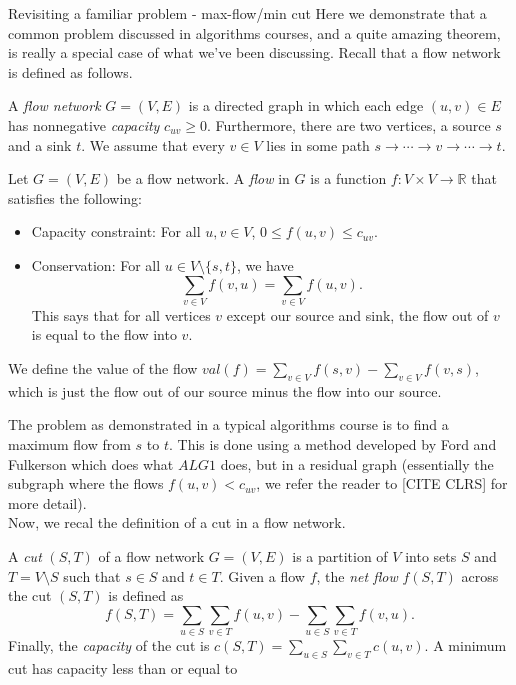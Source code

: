 \documentclass[11pt]{article}
\newcommand{\R}{\mathbb{R}}
\renewcommand{\'}{^{'}}
\newenvironment{definition}[2][Definition]{\begin{trivlist}
\item[\hskip \labelsep {\bfseries #1}\hskip \labelsep {\bfseries #2.}]}{\end{trivlist}}
\begin{document}
\begin{section}{Revisiting a familiar problem - max-flow/min cut}
	Here we demonstrate that a common problem discussed in algorithms courses, and a quite 
	amazing theorem, is really a special case of what we've been discussing. Recall that a 
	flow network is defined as follows.
	\begin{definition}{(Flow network)}
		A \emph{flow network} $G = (V,E)$ is a directed graph in which each edge $(u,v)\in E$ 
		has nonnegative \emph{capacity} $c_{uv} \geq 0$. Furthermore, there are two 
		vertices, a source $s$ and a sink $t$. We assume that every $v\in V$ lies in 
		some path $s\to \cdots \to v\to \cdots \to t$.
	\end{definition}
	\begin{definition}{(Flow)}
		Let $G = (V,E)$ be a flow network. A \emph{flow} in $G$ is a function $f: V\times V \to 
		\R$ that satisfies the following:
		\begin{itemize}
			\item Capacity constraint: For all $u,v\in V$, $0\leq f(u,v) \leq 
				c_{uv}$.
			\item Conservation: For all $u\in V\setminus \{s,t\}$, we have 
				\[
					\sum _{v\in V} f(v,u) = \sum_{v\in V} f(u,v).
				\]
				This says that for all vertices $v$ except our source and sink, the 
				flow out of $v$ is equal to the flow into $v$. 
		\end{itemize}
		We define the value of the flow $val(f) = \sum_{v\in V} f(s,v) - \sum_{v\in V} f(v,s)$, 
		which is just the flow out of our source minus the flow into our source.
	\end{definition}
	The problem as demonstrated in a typical algorithms course is to find a maximum flow from $s$ 
	to $t$. This is done using a method developed by Ford and Fulkerson which does what $ALG 1$ 
	does, but in a residual graph (essentially the subgraph where the flows $f(u,v) < c_{uv}$, we 
	refer the reader to [CITE CLRS] for more detail). \\
	Now, we recal the definition of a cut in a flow network.
	\begin{definition}{(Cut)}
		A \emph{cut} $(S,T)$ of a flow network $G=(V,E)$ is a partition of $V$ into sets $S$ 
		and $T = V\setminus S$ such that $s\in S$ and $t\in T$. Given a flow $f$, the 
		\emph{net flow} $f(S,T)$ across the cut $(S,T)$ is defined as 
		\[
			f(S,T) = \sum_{u\in S} \sum_{v\in T} f(u,v) - \sum_{u\in S} \sum_{v\in T} 
			f(v,u).
		\]
		Finally, the \emph{capacity} of the cut is $c(S,T) = 
		\sum_{u\in S} \sum_{v\in T} c(u,v)$. A minimum cut has capacity less than or equal to 

\end{definition}
\end{section}
\end{document}
